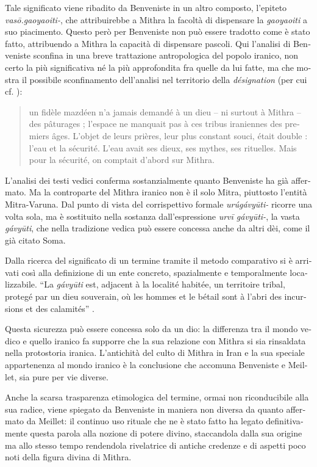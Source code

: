 \documentclass[french,output=paper,colorlinks,citecolor=brown]{../langscibook}
\begin{document}
\begin{otherlanguage}{italian}
Tale significato viene ribadito da Benveniste in un altro composto, l’epiteto \textit{vasō.gaoyaoiti-}, che attribuirebbe a Mithra la facoltà di dispensare la \textit{gaoyaoiti} a suo piacimento. Questo però per Benveniste non può essere tradotto come è stato fatto, attribuendo a Mithra la capacità di dispensare pascoli. Qui l’analisi di Benveniste sconfina in una breve trattazione antropologica del popolo iranico, non certo la più significativa né la più approfondita fra quelle da lui fatte, ma che mostra il possibile sconfinamento dell’analisi nel territorio della \textit{désignation} (per cui cf. \citealt[10]{Benveniste1969}):

\begin{quote}
    un fidèle mazdéen n’a jamais demandé à un dieu – ni surtout à Mithra – des pâturages ; l’espace ne manquait pas à ces tribus iraniennes des premiers âges. L’objet de leurs prières, leur plus constant souci, était double : l’eau et la sécurité. L’eau avait ses dieux, ses mythes, ses rituelles. Mais pour la sécurité, on comptait d’abord sur Mithra. \citep[282]{Benveniste2015}
\end{quote}

L’analisi dei testi vedici conferma sostanzialmente quanto Benveniste ha già affermato. Ma la controparte del Mithra iranico non è il solo Mitra, piuttosto l’entità Mitra-Varuna. Dal punto di vista del corrispettivo formale \textit{urúgávyūti-} ricorre una volta sola, ma è sostituito nella sostanza dall'espressione \textit{urvī gávyūti-}, la vasta \textit{gávyūti}, che nella tradizione vedica può essere concessa anche da altri dèi, come il già citato Soma.

Dalla ricerca del significato di un termine tramite il metodo comparativo si è arrivati così alla definizione di un ente concreto, spazialmente e temporalmente localizzabile. “La \textit{gávyūti} est, adjacent à la localité habitée, un territoire tribal, protegé par un dieu souverain, où les hommes et le bétail sont à l’abri des incursions et des calamités” \citep[284]{Benveniste2015}.

Questa sicurezza può essere concessa solo da un dio: la differenza tra il mondo vedico e quello iranico fa supporre che la sua relazione con Mithra si sia rinsaldata nella protostoria iranica. L’antichità del culto di Mithra in Iran e la sua speciale appartenenza al mondo iranico è la conclusione che accomuna Benveniste e Meillet, sia pure per vie diverse.

Anche la scarsa trasparenza etimologica del termine, ormai non riconducibile alla sua radice, viene spiegato da Benveniste in maniera non diversa da quanto affermato da Meillet: il continuo uso rituale che ne è stato fatto ha legato definitivamente questa parola alla nozione di potere divino, staccandola dalla sua origine ma allo stesso tempo rendendola rivelatrice di antiche credenze e di aspetti poco noti della figura divina di Mithra.


\end{otherlanguage}
\end{document}
